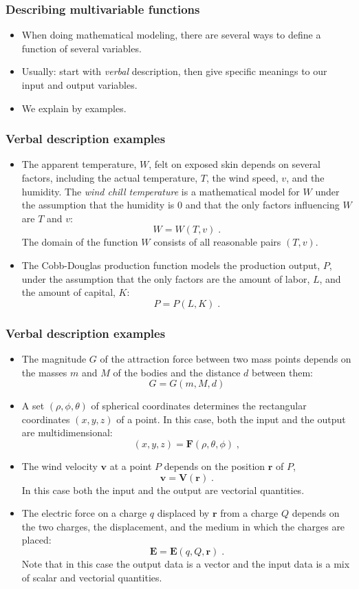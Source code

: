 \begin{frame}\frametitle{Describing multivariable functions}
\begin{itemize}
\item When doing mathematical modeling, there are several ways to define a function of several variables. 
\item<2-> Usually: start with \emph{verbal} description, then give specific meanings
to our input and output variables. 
\item<3-> We explain by examples.
\end{itemize}
\end{frame}

\begin{frame}\frametitle{Verbal description examples}
\begin{itemize}
\item The apparent temperature, $W$, felt on exposed skin depends on several factors, including the actual temperature, $T$, the wind speed, $v$, and the humidity.  The \emph{wind chill temperature} is a mathematical model  for $W$ under the assumption that the humidity is 0 and  that the only factors influencing $W$ are $T$ and $v$:
\[
W = W(T,v)\; .
\]
The domain of the function $W$ consists of all reasonable pairs $(T,v)$.
\item The Cobb-Douglas production function models the production output, $P$, under the assumption that the only factors are the amount of labor, $L$, and the amount of capital, $K$:
\[
P=P(L,K) \; .
\]
\end{itemize}

\vskip 8cm %
\end{frame}
\begin{frame}\frametitle{Verbal description examples}
\begin{itemize}
\item The magnitude $G$ of the attraction force between two mass points depends on the masses $m$ and $M$ of the bodies and the distance $d$ between them:
\[
G=G(m,M,d) 
\]
\item A set $(\rho, \phi, \theta)$ of spherical coordinates determines the rectangular coordinates $(x,y,z)$ of a point. In this case, both the input and the output are multidimensional:
\[
(x,y,z) = \textbf{F}(\rho, \theta, \phi)\; ,
\]
\item The wind velocity $\textbf{v}$ at a point $P$ depends on the position $\textbf{r}$ of $P$,
\[
\textbf{v} = \textbf{V} (\textbf{r})\; .
\]
In this case both the input and the output are vectorial quantities.

\item The electric force on a charge $q$ displaced by $\textbf{r}$ from a charge $Q$ depends on the two charges, the displacement, and the medium in which the charges are placed:
\[
\textbf{E} =\textbf{E}(q, Q,\textbf{r})\; .
\]
Note that in this case the output data is a vector and the input data is a mix of scalar and vectorial quantities.
\end{itemize}

\vskip 8cm %

\end{frame}
